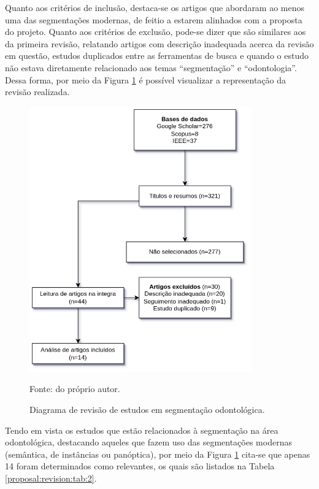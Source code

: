 Quanto aos critérios de inclusão, destaca-se os artigos que abordaram ao menos uma das segmentações modernas, de feitio a estarem alinhados com a proposta do projeto. Quanto aos critérios de exclusão, pode-se dizer que são similares aos da primeira revisão, relatando artigos com descrição inadequada acerca da revisão em questão, estudos duplicados entre as ferramentas de busca e quando o estudo não estava diretamente relacionado aos temas ``segmentação'' e ``odontologia''. Dessa forma, por meio da Figura \ref{proposal:revision:fig:2} é possível visualizar a representação da revisão realizada.

\begin{figure}[H]
    \centering
    \caption{Diagrama de revisão de estudos em segmentação odontológica.}
    \includegraphics[height=4.5in]{recursos/imagens/proposal/revisao_odonto.png}
    \label{proposal:revision:fig:2}


    Fonte: do próprio autor.
\end{figure}

Tendo em vista os estudos que estão relacionados à segmentação na área odontológica, destacando aqueles que fazem uso das segmentações modernas (semântica, de instâncias ou panóptica), por meio da Figura \ref{proposal:revision:fig:2} cita-se que apenas 14 foram determinados como relevantes, os quais são listados na Tabela \ref{proposal:revision:tab:2}.

